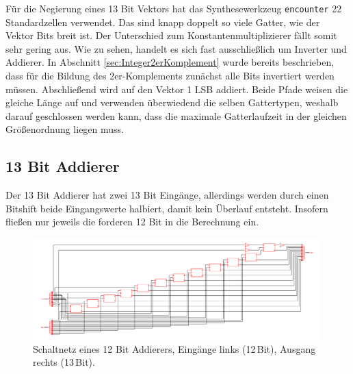 Für die Negierung eines 13 Bit Vektors hat das Synthesewerkzeug \texttt{encounter} 22 Standardzellen verwendet. Das sind knapp doppelt so viele Gatter, wie der Vektor 
Bits breit ist. Der Unterschied zum Konstantenmultiplizierer fällt somit sehr gering aus. 
Wie zu sehen, handelt es sich fast ausschließlich um Inverter und Addierer. In Abschnitt \ref{sec:Integer2erKomplement} wurde bereits beschrieben, dass für die Bildung des
2er-Komplements zunächst alle Bits invertiert werden müssen. Abschließend wird auf den Vektor 1 LSB addiert. 
Beide Pfade weisen die gleiche Länge auf und verwenden überwiedend die selben
Gattertypen, weshalb darauf geschlossen werden kann, dass die maximale Gatterlaufzeit in der gleichen Größenordnung liegen muss.

\subsection{13 Bit Addierer}
Der 13 Bit Addierer hat zwei 13 Bit Eingänge, allerdings werden durch einen Bitshift beide Eingangswerte halbiert, damit kein Überlauf entsteht. Insofern fließen nur jeweils 
die forderen 12 Bit in die Berechnung ein.
\begin{figure}[htbp]
 \centering
 \includegraphics[width=0.99\textwidth]{img/13Bit_Addierer.png}
 \caption{Schaltnetz eines 12 Bit Addierers, Eingänge links (12\,Bit), Ausgang rechts (13\,Bit).}
 \label{pic:13BitAddierer}
\end{figure}

